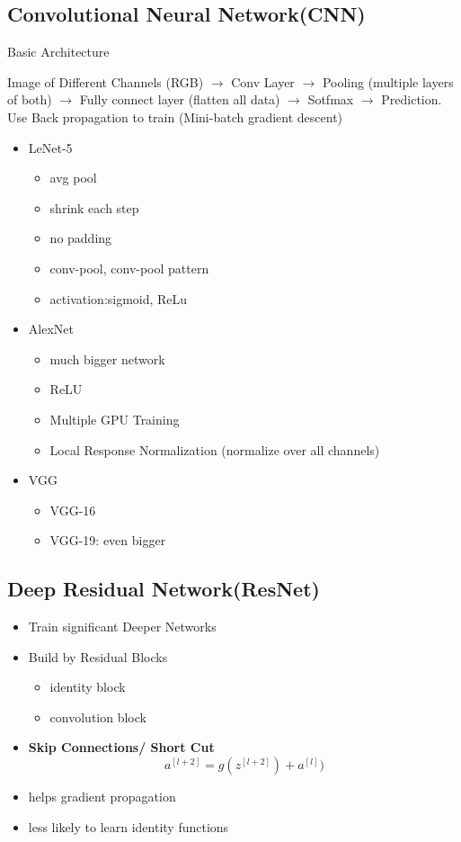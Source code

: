 \documentclass[11pt, openany]{book}              %
\begin{document}
\subsection{Convolutional Neural Network(CNN)}

Basic Architecture

Image of Different Channels (RGB)  $\rightarrow$  Conv Layer  $\rightarrow$  Pooling (multiple layers of both)  $\rightarrow$  Fully connect layer (flatten all data)  $\rightarrow$  Sotfmax  $\rightarrow$ Prediction. Use Back propagation to train (Mini-batch gradient descent)

\begin{itemize}
\item LeNet-5
\begin{itemize}
	\item avg pool
	\item shrink each step
	\item no padding
	\item conv-pool, conv-pool pattern
	\item activation:sigmoid, ReLu
\end{itemize}
\item AlexNet
\begin{itemize}
	\item much bigger network
	\item ReLU
	\item Multiple GPU Training
	\item Local Response Normalization (normalize over all channels)
\end{itemize}
\item VGG
\begin{itemize}
	\item VGG-16
	\item VGG-19: even bigger
\end{itemize}
\end{itemize}


\subsection{Deep Residual Network(ResNet)}

\begin{itemize}
\item Train significant Deeper Networks
\item Build by Residual Blocks
\begin{itemize}
	\item identity block
	\item convolution block
\end{itemize}
\item \textbf{Skip Connections/ Short Cut}
$$ a^{[l+2]}= g(z^{[l+2]}) + a^{[l]})$$
\item helps gradient propagation
\item less likely to learn identity functions
\end{itemize}
\end{document}
